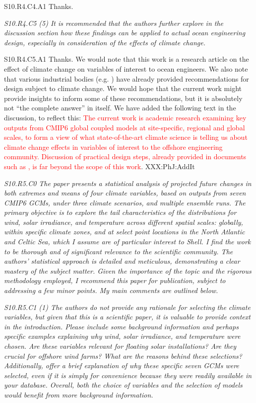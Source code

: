 \documentclass[a4paper,10pt]{article}
\newcommand{\ed}[1]{\textcolor{red}{#1}}
\begin{document}
	S10.R4.C4.A1 Thanks.

	\emph{S10.R4.C5 (5) It is recommended that the authors further explore in the discussion section how these findings can be applied to actual ocean engineering design, especially in consideration of the effects of climate change.}

	S10.R4.C5.A1 Thanks. We would note that this work is a research article on the effect of climate change on variables of interest to ocean engineers. We also note that various industrial bodies (e.g. \citealt{IOGP24}) have already provided recommendations for design subject to climate change. We would hope that the current work might provide insights to inform some of these recommendations, but it is absolutely not ``the complete answer'' in itself. We have added the following text in the discussion, to reflect this: \ed{The current work is academic research examining key outputs from CMIP6 global coupled models at site-specific, regional and global scales, to form a view of what state-of-the-art climate science is telling us about climate change effects in variables of interest to the offshore engineering community. Discussion of practical design steps, already provided in documents such as \citealt{IOGP24}, is far beyond the scope of this work}. XXX:PhJ:AddIt

	\emph{S10.R5.C0 The paper presents a statistical analysis of projected future changes in both extremes and means of four climate variables, based on outputs from seven CMIP6 GCMs, under three climate scenarios, and multiple ensemble runs. The primary objective is to explore the tail characteristics of the distributions for wind, solar irradiance, and temperature across different spatial scales: globally, within specific climate zones, and at select point locations in the North Atlantic and Celtic Sea, which I assume are of particular interest to Shell. I find the work to be thorough and of significant relevance to the scientific community. The authors' statistical approach is detailed and meticulous, demonstrating a clear mastery of the subject matter. Given the importance of the topic and the rigorous methodology employed, I recommend this paper for publication, subject to addressing a few minor points. My main comments are outlined below.}

	\emph{S10.R5.C1 (1) The authors do not provide any rationale for selecting the climate variables, but given that this is a scientific paper, it is valuable to provide context in the introduction. Please include some background information and perhaps specific examples explaining why wind, solar irradiance, and temperature were chosen. Are these variables relevant for floating solar installations? Are they crucial for offshore wind farms? What are the reasons behind these selections? Additionally, offer a brief explanation of why these specific seven GCMs were selected, even if it is simply for convenience because they were readily available in your database. Overall, both the choice of variables and the selection of models would benefit from more background information.}
\end{document}
